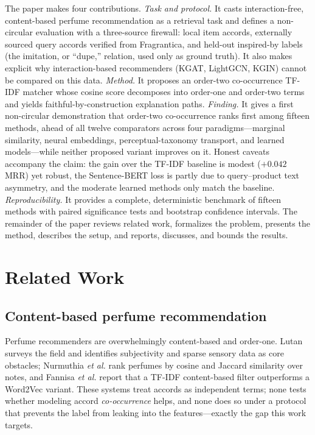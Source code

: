 \documentclass[conference]{IEEEtran}
\begin{document}
The paper makes four contributions. \emph{Task and protocol.} It casts interaction-free,
content-based perfume recommendation as a retrieval task and defines a non-circular
evaluation with a three-source firewall: local item accords, externally sourced query
accords verified from Fragrantica, and held-out inspired-by labels (the imitation, or
``dupe,'' relation, used only as ground truth). It also makes explicit why interaction-based
recommenders (KGAT, LightGCN, KGIN) cannot be compared on this data. \emph{Method.} It
proposes an order-two co-occurrence TF-IDF matcher whose cosine score decomposes into
order-one and order-two terms and yields faithful-by-construction explanation paths.
\emph{Finding.} It gives a first non-circular demonstration that order-two co-occurrence
ranks first among fifteen methods, ahead of all twelve comparators across four
paradigms---marginal similarity, neural embeddings, perceptual-taxonomy transport, and
learned models---while neither proposed variant improves on it. Honest caveats accompany the
claim: the gain over the TF-IDF baseline is modest ($+0.042$ MRR) yet robust, the
Sentence-BERT loss is partly due to query--product text asymmetry, and the moderate learned
methods only match the baseline. \emph{Reproducibility.} It provides a complete,
deterministic benchmark of fifteen methods with paired significance tests and bootstrap
confidence intervals. The remainder of the paper reviews related work, formalizes the
problem, presents the method, describes the setup, and reports, discusses, and bounds the
results.

\section{Related Work}\label{sec:related}

\subsection{Content-based perfume recommendation}
Perfume recommenders are overwhelmingly content-based and order-one. Lutan \cite{r23}
surveys the field and identifies subjectivity and sparse sensory data as core obstacles;
Nurmuthia \textit{et al.} \cite{r24} rank perfumes by cosine and Jaccard similarity over
notes, and Fannisa \textit{et al.} \cite{r28} report that a TF-IDF content-based filter
outperforms a Word2Vec variant. These systems treat accords as independent terms; none
tests whether modeling accord \emph{co-occurrence} helps, and none does so under a
protocol that prevents the label from leaking into the features---exactly the gap this
work targets.
\end{document}
